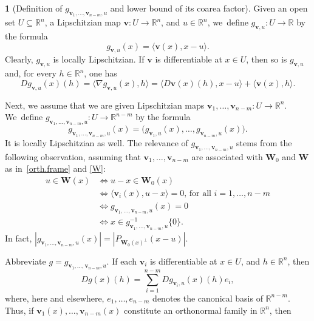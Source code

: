 \documentclass[11pt]{article}
\newcounter{cdrthm}[section]
\theoremstyle{definition}
\theoremstyle{jepanonymous}
\newtheorem{jepempty}[cdrthm]{}
\newenvironment{enonce}[2][remark]{\begin{jepempty}[#2]}{\end{jepempty}}
\theoremstyle{plain}
\newenvironment{Empty}[2][\null]{%
\begin{enonce}[remark]{#1}#2}
{\end{enonce}}
\newcommand{\R}{\mathbb{R}}
\newcommand{\Rn}{\R^n}
\newcommand{\bW}{{\boldsymbol{W}}}
\newcommand{\bv}{{\boldsymbol{v}}}
\let\la\langle
\let\ra\rangle
\let\subset\subseteq
\begin{document}
\begin{Empty}[Definition of $g_{\bv_1,\ldots,\bv_{n-m},u}$ and lower bound of its coarea factor]
Given an open set $U \subset \Rn$, a Lipschitzian map $\bv: U \to \Rn$, and $u \in \Rn$, we~define $g_{\bv,u}: U \to \R$ by the formula
\begin{equation*}
g_{\bv,u}(x) = \la \bv(x), x-u \ra.
\end{equation*}
Clearly, $g_{\bv,u}$ is locally Lipschitzian.
If $\bv$ is differentiable at $x \in U$, then so is $g_{\bv,u}$ and, for every $h \in \Rn$, one has
\begin{equation}
\label{eq.2}
Dg_{\bv,u}(x)(h) = \la \nabla g_{\bv,u}(x),h \ra = \la D\bv(x)(h), x-u \ra + \la \bv(x), h \ra.
\end{equation}
\par
Next, we assume that we are given Lipschitzian maps $\bv_1,\ldots,\bv_{n-m}: U \to \Rn$.
We~define $g_{\bv_1,\ldots,\bv_{n-m},u}: U \to \R^{n-m}$ by the formula
\begin{equation*}
g_{\bv_1,\ldots,\bv_{n-m},u}(x) = \bigl(g_{\bv_1,u}(x), \ldots, g_{\bv_{n-m},u}(x) \bigr).
\end{equation*}
It is locally Lipschitzian as well.
The relevance of $g_{\bv_1,\ldots,\bv_{n-m},u}$ stems from the following observation, assuming that $\bv_1,\ldots,\bv_{n-m}$ are associated with $\bW_0$ and $\bW$ as in~\ref{orth.frame} and \ref{W}:
\begin{equation}
\label{eq.7}
\begin{split}
u \in \bW(x) & \iff u-x \in \bW_0(x) \\
& \iff \la \bv_i(x), u-x \ra = 0 \text{, for all } i=1,\ldots,n-m \\
& \iff g_{\bv_1,\ldots,\bv_{n-m},u}(x)=0 \\
& \iff x \in g_{\bv_1,\ldots,\bv_{n-m},u}^{-1}\{0\}.
\end{split}
\end{equation}
In fact, $|g_{\bv_1,\ldots,\bv_{n-m},u}(x)| = \left| P_{\bW_0(x)^\perp}(x-u)\right|$.
\par
Abbreviate $g = g_{\bv_1,\ldots,\bv_{n-m},u}$.
If each $\bv_i$ is differentiable at $x \in U$, and $h \in \Rn$, then
\begin{equation*}
Dg(x)(h) = \sum_{i=1}^{n-m} Dg_{\bv_i,u}(x)(h)e_i,
\end{equation*}
where, here and elsewhere, $e_1,\ldots,e_{n-m}$ denotes the canonical basis of $\R^{n-m}$.
Thus, if $\bv_1(x),\ldots,\bv_{n-m}(x)$ constitute an orthonormal family in $\Rn$, then
\begin{equation*}

\end{equation*}
\end{Empty}
\end{document}
